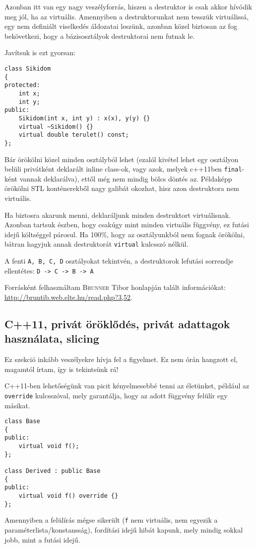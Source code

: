 \documentclass[a4paper,11.5pt]{article}
\begin{document}
	Azonban itt van egy nagy veszélyforrás, hiszen a destruktor is csak akkor hívódik meg jól, ha az virtuális. Amennyiben a destruktorunkat nem tesszük virtuálissá, egy nem definiált viselkedés áldozatai leszünk, azonban közel biztosan az fog bekövetkezi, hogy a bázisosztályok destruktorai nem futnak le.
	
	\smallskip
	Javítsuk is ezt gyorsan:
\begin{lstlisting}
class Sikidom
{
protected:
	int x;
	int y;
public:
	Sikidom(int x, int y) : x(x), y(y) {}
	virtual ~Sikidom() {}
	virtual double terulet() const;
};
\end{lstlisting}
	Bár örökölni közel minden osztályból lehet (ezalól kivétel lehet egy osztályon belüli privátként deklarált inline class-ok, vagy azok, melyek c++11ben \texttt{final}-ként vannak deklarálva), ettől még nem mindig bölcs döntés az. Példaképp örökölni STL konténerekből nagy galibát okozhat, hisz azon destruktora nem virtuális.
	
	\medskip
	Ha biztosra akarunk menni, deklaráljunk minden destruktort virtuálisnak. Azonban tartsuk észben, hogy csakúgy mint minden virtuális függvény, ez futási idejű költséggel párosul. Ha 100\%, hogy az osztályunkból nem fognak örökölni, bátran hagyjuk annak destruktorát \texttt{virtual} kulcsszó nélkül.
	
	\medskip
	A fenti \texttt{A, B, C, D} osztályokat tekintvén, a destruktorok lefutási sorrendje ellentétes:  \texttt{D -> C -> B -> A}
	
	\bigskip
	
	Forrásként felhasználtam \textsc{Brunner} Tibor honlapján talált információkat: \url{http://bruntib.web.elte.hu/read.php?3,52}.
	
	\subsection{C++11, privát öröklődés, privát adattagok használata, slicing}
	Ez szekció inkább veszélyekre hívja fel a figyelmet. Ez nem órán hangzott el, magamtól írtam, így is tekintsünk rá!
	
	\medskip
	C++11-ben lehetőségünk van picit kényelmesebbé tenni az életünket, például az \texttt{override} kulcsszóval, mely garantálja, hogy az adott függvény felülír egy másikat.
	\begin{lstlisting}
class Base
{
public:
	virtual void f();
};

class Derived : public Base
{
public:
	virtual void f() override {}
};
	\end{lstlisting}
	Amennyiben a felülírás mégse sikerült (\texttt{f} nem virtuális, nem egyezik a paraméterlista/konstansság), fordítási idejű hibát kapunk, mely mindig sokkal jobb, mint a futási idejű.
	
\end{document}
